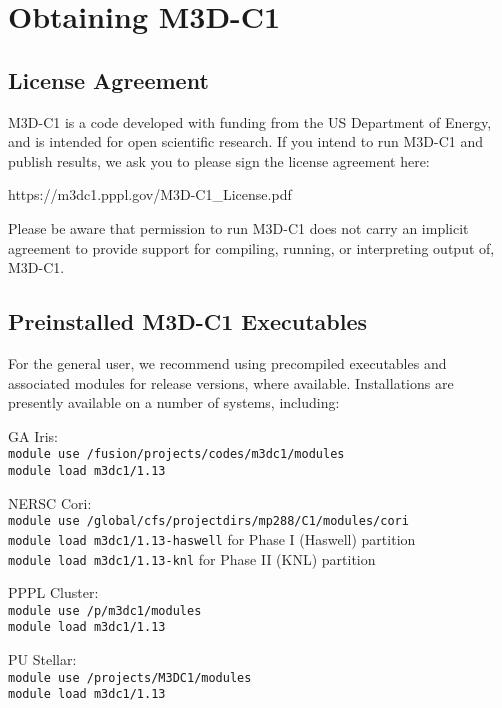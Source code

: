 \section{Obtaining M3D-C1}

\subsection{License Agreement}

M3D-C1 is a code developed with funding from the US Department of
Energy, and is intended for open scientific research.  If you intend
to run M3D-C1 and publish results, we ask you to please sign the
license agreement here:

https://m3dc1.pppl.gov/M3D-C1\_License.pdf

Please be aware that permission to run M3D-C1 does not carry an
implicit agreement to provide support for compiling, running, or
interpreting output of, M3D-C1.


\subsection{Preinstalled M3D-C1 Executables}

For the general user, we recommend using precompiled executables and
associated modules for release versions, where available.
Installations are presently available on a number of systems,
including:

\begin{description}
\item{GA Iris}:\\
  \texttt{module use /fusion/projects/codes/m3dc1/modules}\\
  \texttt{module load m3dc1/1.13}
\item{NERSC Cori}:\\
  \texttt{module use /global/cfs/projectdirs/mp288/C1/modules/cori}\\
  \texttt{module load m3dc1/1.13-haswell}\quad
  for Phase I (Haswell) partition\\
  \texttt{module load m3dc1/1.13-knl}\quad
  for Phase II (KNL) partition
\item{PPPL Cluster}:\\
  \texttt{module use /p/m3dc1/modules}\\
  \texttt{module load m3dc1/1.13}
\item{PU Stellar}:\\
  \texttt{module use /projects/M3DC1/modules}\\
  \texttt{module load m3dc1/1.13}
\end{description}

